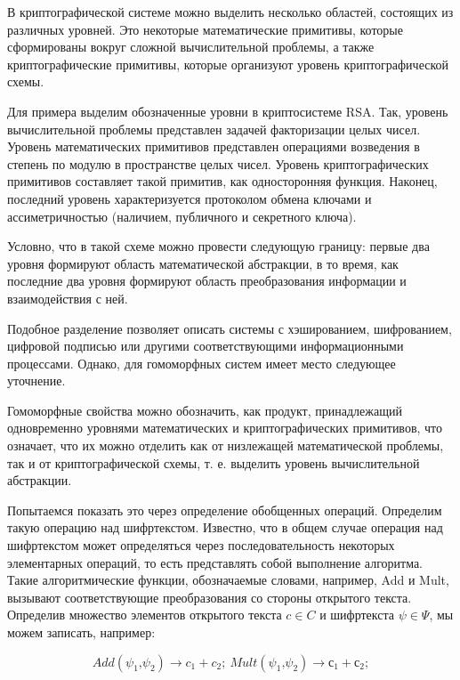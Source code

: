 
\newcommand{\cmm}{\textrm{,}}

      В криптографической системе можно выделить  несколько областей, состоящих из различных уровней. Это некоторые математические примитивы, которые сформированы вокруг сложной вычислительной проблемы, а также криптографические примитивы, которые организуют уровень криптографической схемы.

\color{Gray} \tiny
      Для примера выделим обозначенные уровни в криптосистеме RSA. Так, уровень вычислительной проблемы представлен задачей факторизации целых чисел. Уровень математических примитивов представлен операциями возведения в степень по модулю в пространстве целых чисел. Уровень криптографических примитивов составляет такой примитив, как односторонняя функция. Наконец, последний уровень характеризуется протоколом обмена ключами и ассиметричностью (наличием, публичного и секретного ключа).
\normalcolor \normalsize

      Условно, что в такой схеме можно провести следующую границу: первые два уровня формируют область математической абстракции, в то время, как последние два уровня формируют область преобразования информации и взаимодействия с ней.

\color{Gray} \tiny
      Подобное разделение позволяет описать системы с хэшированием, шифрованием, цифровой подписью или другими соответствующими информационными процессами. Однако, для гомоморфных систем имеет место следующее уточнение.
\normalcolor \normalsize

      Гомоморфные свойства можно обозначить, как продукт, принадлежащий одновременно уровнями математических и криптографических примитивов, что означает, что их можно отделить как от низлежащей математической проблемы, так и от криптографической схемы, т. е. выделить уровень вычислительной абстракции.

      Попытаемся показать это через определение обобщенных операций. Определим такую операцию над шифртекстом. Известно, что в общем случае операция над шифртекстом может определяться через последовательность некоторых элементарных операций, то есть представлять собой выполнение алгоритма. Такие алгоритмические функции, обозначаемые словами, например, Add и Mult, вызывают соответствующие преобразования со стороны открытого текста. Определив множество элементов открытого текста $c\in C$ и шифртекста $\psi \in \Psi $, мы можем записать, например:

      \[Add\left({\psi }_1 \cmm {\psi }_2\right)\to c_1+c_2;~Mult\left({\psi }_1 \cmm {\psi }_2\right)\to с_1+с_2;\] 

